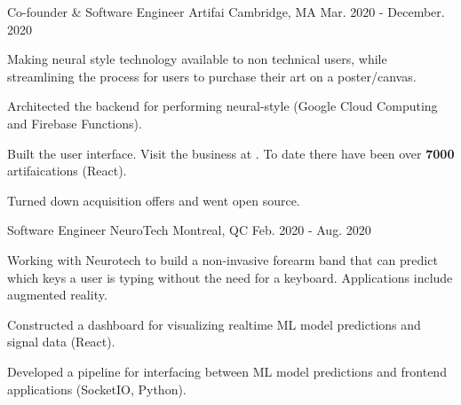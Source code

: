 \begin{cventries}
  \cventry
    {Co-founder \& Software Engineer} %
    {Artifai} %
    {Cambridge, MA} %
    {Mar. 2020 - December. 2020} %
    {
      \begin{cvitems} %
      \item {Making neural style technology available to non technical users, while streamlining the process for users to purchase their art on a poster/canvas.}
      \item {Architected the backend for performing neural-style (Google Cloud Computing and Firebase Functions).}
      \item {Built the user interface. Visit the business at . To date there have been over \textbf{7000} artifaications (React).}
      \item {Turned down acquisition offers and went open source.}
      \end{cvitems}
    }

  \cventry
    {Software Engineer} %
    {NeuroTech} %
    {Montreal, QC} %
    {Feb. 2020 - Aug. 2020} %
    {
      \begin{cvitems} %
      \item {Working with Neurotech to build a non-invasive forearm band that can predict which keys a user is typing without the need for a keyboard. Applications include augmented reality.}
      \item {Constructed a dashboard for visualizing realtime ML model predictions and signal data (React).}
      \item {Developed a pipeline for interfacing between ML model predictions and frontend applications (SocketIO, Python).}
      \end{cvitems}
    }


\end{cventries}
